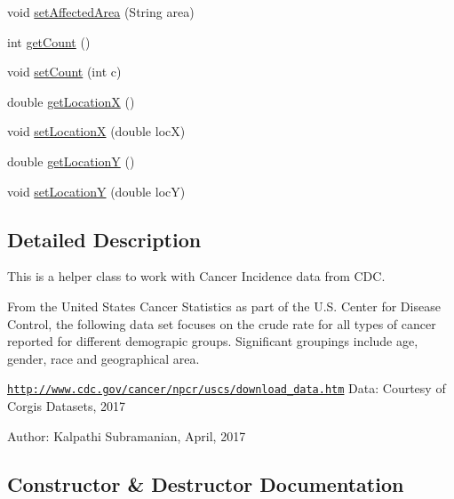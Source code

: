 \begin{DoxyCompactItemize}
\item 
void \mbox{\hyperlink{classbridges_1_1data__src__dependent_1_1_cancer_incidence_a9c7f2d303da9498e5e6145439c5a6fbc}{set\+Affected\+Area}} (String area)
\item 
int \mbox{\hyperlink{classbridges_1_1data__src__dependent_1_1_cancer_incidence_a8769cb18ddb590dc41a04a220174f3df}{get\+Count}} ()
\item 
void \mbox{\hyperlink{classbridges_1_1data__src__dependent_1_1_cancer_incidence_a18099439ef6e35cf240b06f0e0158c72}{set\+Count}} (int c)
\item 
double \mbox{\hyperlink{classbridges_1_1data__src__dependent_1_1_cancer_incidence_a24aa8144dcacd93a26c3c033471666df}{get\+LocationX}} ()
\item 
void \mbox{\hyperlink{classbridges_1_1data__src__dependent_1_1_cancer_incidence_a384149c413173fba51adad1b1769797a}{set\+LocationX}} (double locX)
\item 
double \mbox{\hyperlink{classbridges_1_1data__src__dependent_1_1_cancer_incidence_a53b56a9931a1d02ee356c6258e245aa8}{get\+LocationY}} ()
\item 
void \mbox{\hyperlink{classbridges_1_1data__src__dependent_1_1_cancer_incidence_a14c6921a71834c14d561bc7f2aa8a18e}{set\+LocationY}} (double locY)
\end{DoxyCompactItemize}


\subsection{Detailed Description}
This is a helper class to work with Cancer Incidence data from C\+DC. 

From the United States Cancer Statistics as part of the U.\+S. Center for Disease Control, the following data set focuses on the crude rate for all types of cancer reported for different demograpic groups. Significant groupings include age, gender, race and geographical area.

\href{http://www.cdc.gov/cancer/npcr/uscs/download_data.htm}{\tt http\+://www.\+cdc.\+gov/cancer/npcr/uscs/download\+\_\+data.\+htm} Data\+: Courtesy of Corgis Datasets, 2017

Author\+: Kalpathi Subramanian, April, 2017 

\subsection{Constructor \& Destructor Documentation}
\mbox{\label{classbridges_1_1data__src__dependent_1_1_cancer_incidence_a92db1eb4292c77f07619019587caf5cc}} 
